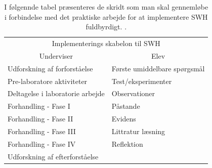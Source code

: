 \begin{table}
	\centering
	\caption{I følgennde tabel præsenteres de skridt som man skal gennemløbe i forbindelse med det praktiske arbejde for at implementere SWH fuldbyrdigt. 
	\citet{Hand2004, Keys1999}.}
	\label{tbl:2.2}
	\begin{tabular}{@{ } l l @{ }}
		\toprule[2.5pt]
			\multicolumn{2}{c}{Implementerings skabelon til SWH}\\
			\multicolumn{1}{c}{Underviser} & \multicolumn{1}{c}{Elev}\\
		\midrule[1.25pt]
			Udforskning af forforståelse 	& Første umiddelbare spørgsmål\\
			Pre-laboratore aktiviteter 		& Test/eksperimenter\\
			Deltagelse i laboratorie arbejde 	& Observationer\\
			Forhandling - Fase I 			& Påstande\\
			Forhandling - Fase II			& Evidens\\
			Forhandling - Fase III			& Littratur læsning\\
			Forhandling - Fase IV			& Reflektion\\
			Udforskning af efterforståelse	& \\
		\bottomrule[2.5pt]
	\end{tabular}
\end{table}

